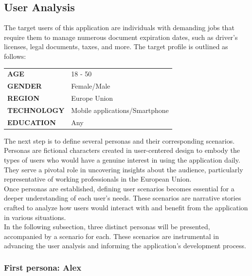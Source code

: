 \subsection{User Analysis}
The target users of this application are individuals with demanding jobs that require them to manage numerous document expiration dates, such as driver's licenses, legal documents, taxes, and more. The target profile is outlined as follows:
\begin{table}[H]
	\centering
	\begin{tabularx}{\textwidth}{XX}
		\textbf{AGE}& 18 - 50\\
		\textbf{GENDER}& Female/Male\\
		\textbf{REGION}& Europe Union\\
		\textbf{TECHNOLOGY}&Mobile applications/Smartphone\\
		\textbf{EDUCATION}& Any\\
	\end{tabularx}
\end{table}
\noindent
The next step is to define several personas and their corresponding scenarios. Personas are fictional characters created in user-centered design to embody the types of users who would have a genuine interest in using the application daily. They serve a pivotal role in uncovering insights about the audience, particularly representative of working professionals in the European Union.\\
Once personas are established, defining user scenarios becomes essential for a deeper understanding of each user's needs. These scenarios are narrative stories crafted to analyze how users would interact with and benefit from the application in various situations.\\
In the following subsection, three distinct personas will be presented, accompanied by a scenario for each. These scenarios are instrumental in advancing the user analysis and informing the application's development process.\\
\subsubsection{First persona: Alex}

